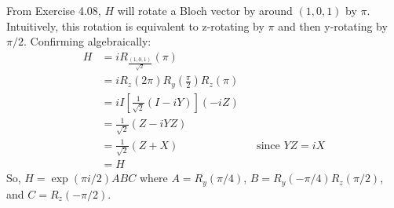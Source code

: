 \begingroup
\newcommand{\roto}[2]{R_{#1} \left( #2 \right)}
\newcommand{\expo}[1]{\exp \left( #1 \right)}
%
\par From Exercise 4.08, $H$ will rotate a Bloch vector by around $\left( 1, 0, 1 \right)$ by $\pi$.
%
Intuitively, this rotation is equivalent to z-rotating by $\pi$ and then y-rotating by $\pi / 2$.
%
Confirming algebraically:
%
\begin{align*}
H &= i \roto{\frac{\left( 1, 0, 1 \right)}{\sqrt{2}}}{\pi} \\
&= i \roto{z}{2 \pi} \roto{y}{\frac{\pi}{2}} \roto{z}{\pi} \\
&= i I \left[ \frac{1}{\sqrt{2}} \left( I - i Y \right) \right] \left( -i Z \right) \\
&= \frac{1}{\sqrt{2}} \left( Z - iYZ \right) \\
&= \frac{1}{\sqrt{2}} \left( Z + X \right) && \text{since $YZ = iX$} \\
&= H
\end{align*}
%
So, $H = \expo{\pi i / 2} ABC$ where $A = \roto{y}{\pi / 4}$, $B = \roto{y}{-\pi / 4} \roto{z}{\pi / 2}$, and $C = \roto{z}{-\pi / 2}$.
\endgroup
